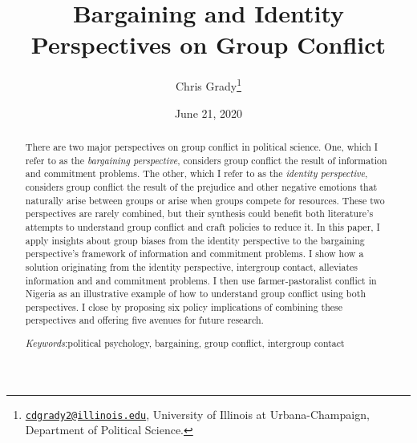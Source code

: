 \documentclass[11pt]{article}
\title{Bargaining and Identity Perspectives on Group Conflict}
\author{\parbox{.7\linewidth}{\centering
Chris Grady\thanks{\href{mailto:cdgrady2@illinois.edu}{\nolinkurl{cdgrady2@illinois.edu}},
University of Illinois at Urbana-Champaign, Department of Political
Science.} \quad
}
}
\date{June 21, 2020}
\begin{document}
\VerbatimFootnotes

%
%
%
%
%
%
%
%
%
%


\maketitle

\begin{abstract}\singlespacing\noindent
There are two major perspectives on group conflict in political science.
One, which I refer to as the \emph{bargaining perspective}, considers
group conflict the result of information and commitment problems. The
other, which I refer to as the \emph{identity perspective}, considers
group conflict the result of the prejudice and other negative emotions
that naturally arise between groups or arise when groups compete for
resources. These two perspectives are rarely combined, but their
synthesis could benefit both literature's attempts to understand group
conflict and craft policies to reduce it. In this paper, I apply
insights about group biases from the identity perspective to the
bargaining perspective's framework of information and commitment
problems. I show how a solution originating from the identity
perspective, intergroup contact, alleviates information and and
commitment problems. I then use farmer-pastoralist conflict in Nigeria
as an illustrative example of how to understand group conflict using
both perspectives. I close by proposing six policy implications of
combining these perspectives and offering five avenues for future
research.
\\ \par\noindent\emph{Keywords}:political psychology, bargaining, group conflict, intergroup contact\par
\end{abstract}
\end{document}

